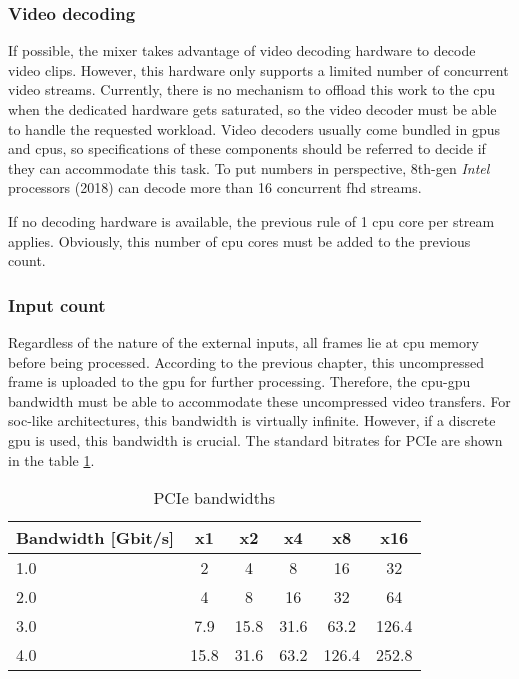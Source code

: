 \documentclass[../main.tex]{subfiles}
\begin{document}
\subsubsection{Video decoding}
If possible, the mixer takes advantage of video decoding hardware to decode video clips. However, this hardware only supports a limited number of concurrent video streams. Currently, there is no mechanism to offload this work to the \gls{cpu} when the dedicated hardware gets saturated, so the video decoder must be able to handle the requested workload. Video decoders usually come bundled in \glspl{gpu} and \glspl{cpu}, so specifications of these components should be referred to decide if they can accommodate this task. To put numbers in perspective, 8th-gen \textit{Intel} processors (2018) can decode more than 16 concurrent \gls{fhd} streams\cite{intelCpuDoc}.\newline

If no decoding hardware is available, the previous rule of 1 \gls{cpu} core per stream applies. Obviously, this number of \gls{cpu} cores must be added to the previous count.\newline

\subsubsection{Input count}
Regardless of the nature of the external inputs, all frames lie at \gls{cpu} memory before being processed. According to the previous chapter, this uncompressed frame is uploaded to the \gls{gpu} for further processing. Therefore, the \gls{cpu}-\gls{gpu} bandwidth must be able to accommodate these uncompressed video transfers. For \gls{soc}-like architectures, this bandwidth is virtually infinite. However, if a discrete \gls{gpu} is used, this bandwidth is crucial. The standard bitrates for PCIe are shown in the table \ref{tab:05:pcie_bandwidth}.\newline

\begin{table}[htbp]
    \centering
    \begin{tabular}{|l|c|c|c|c|c|}
        \hline
        Bandwidth [Gbit/s]      & x1    & x2    & x4    & x8    & x16     \\\hline
        1.0                     & 2     & 4     & 8     & 16    & 32      \\\hline
        2.0                     & 4     & 8     & 16    & 32    & 64      \\\hline
        3.0                     & 7.9   & 15.8  & 31.6  & 63.2  & 126.4   \\\hline
        4.0                     & 15.8  & 31.6  & 63.2  & 126.4 & 252.8   \\\hline
    \end{tabular}

    \caption{PCIe bandwidths}
    \label{tab:05:pcie_bandwidth}
\end{table}
\end{document}
